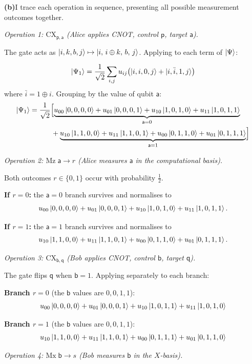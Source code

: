\documentclass[12pt,a4paper]{article}
\begin{document}
\medskip
\noindent\textbf{(b)}\enspace I trace each operation in sequence, presenting all possible measurement outcomes together.

\medskip
\textit{Operation 1: $\mathrm{CX}_{\mathsf{p},\mathsf{a}}$ (Alice applies CNOT, control $\mathsf{p}$, target $\mathsf{a}$).}

The gate acts as $\ket{i,k,b,j}\mapsto\ket{i,\,i\oplus k,\,b,\,j}$.
Applying to each term of $\ket{\Psi}$:

\[
  \ket{\Psi_1}
  = \frac{1}{\sqrt{2}}\sum_{i,j}u_{ij}\bigl(\ket{i,i,0,j}+\ket{i,\bar{i},1,j}\bigr)
\]
where $\bar{i}=1\oplus i$. Grouping by the value of qubit $\mathsf{a}$:
\begin{align*}
\ket{\Psi_1}
  &= \frac{1}{\sqrt{2}}\Bigl[
      \underbrace{u_{00}\ket{0,0,0,0}+u_{01}\ket{0,0,0,1}
                 +u_{10}\ket{1,0,1,0}+u_{11}\ket{1,0,1,1}}_{\mathsf{a}=0}\\
  &\qquad\quad
     +\underbrace{u_{10}\ket{1,1,0,0}+u_{11}\ket{1,1,0,1}
                 +u_{00}\ket{0,1,1,0}+u_{01}\ket{0,1,1,1}}_{\mathsf{a}=1}
     \Bigr]
\end{align*}

\medskip
\textit{Operation 2: $\mathrm{Mz}\;\mathsf{a}\to r$ (Alice measures $\mathsf{a}$ in the computational basis).}

Both outcomes $r\in\{0,1\}$ occur with probability $\tfrac{1}{2}$.

\textbf{If $r=0$:} the $\mathsf{a}=0$ branch survives and normalises to
\[
  u_{00}\ket{0,0,0,0}+u_{01}\ket{0,0,0,1}+u_{10}\ket{1,0,1,0}+u_{11}\ket{1,0,1,1}.
\]

\textbf{If $r=1$:} the $\mathsf{a}=1$ branch survives and normalises to
\[
  u_{10}\ket{1,1,0,0}+u_{11}\ket{1,1,0,1}+u_{00}\ket{0,1,1,0}+u_{01}\ket{0,1,1,1}.
\]

\medskip
\textit{Operation 3: $\mathrm{CX}_{\mathsf{b},\mathsf{q}}$ (Bob applies CNOT, control $\mathsf{b}$, target $\mathsf{q}$).}

The gate flips $\mathsf{q}$ when $\mathsf{b}=1$. Applying separately to each branch:

\textbf{Branch $r=0$} (the $\mathsf{b}$ values are $0,0,1,1$):
\[
  u_{00}\ket{0,0,0,0}+u_{01}\ket{0,0,0,1}+u_{10}\ket{1,0,1,1}+u_{11}\ket{1,0,1,0}
\]

\textbf{Branch $r=1$} (the $\mathsf{b}$ values are $0,0,1,1$):
\[
  u_{10}\ket{1,1,0,0}+u_{11}\ket{1,1,0,1}+u_{00}\ket{0,1,1,1}+u_{01}\ket{0,1,1,0}
\]

\medskip
\textit{Operation 4: $\mathrm{Mx}\;\mathsf{b}\to s$ (Bob measures $\mathsf{b}$ in the $X$-basis).}
\end{document}
